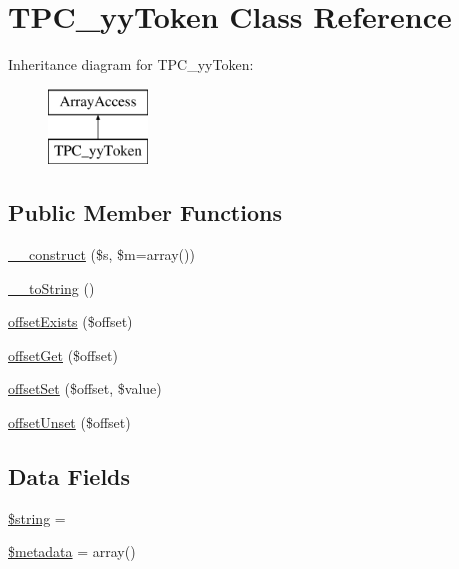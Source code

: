 \hypertarget{class_t_p_c__yy_token}{}\section{T\+P\+C\+\_\+yy\+Token Class Reference}
\label{class_t_p_c__yy_token}
Inheritance diagram for T\+P\+C\+\_\+yy\+Token\+:\begin{figure}[H]
\begin{center}
\leavevmode
\includegraphics[height=2.000000cm]{class_t_p_c__yy_token}
\end{center}
\end{figure}
\subsection*{Public Member Functions}
\begin{DoxyCompactItemize}
\item 
\hyperlink{class_t_p_c__yy_token_ad19e3b36f3e7325b04134c2c8907b139}{\+\_\+\+\_\+construct} (\$s, \$m=array())
\item 
\hyperlink{class_t_p_c__yy_token_a7516ca30af0db3cdbf9a7739b48ce91d}{\+\_\+\+\_\+to\+String} ()
\item 
\hyperlink{class_t_p_c__yy_token_a24ff257ec0c2221bc6fd7b1b4388e26e}{offset\+Exists} (\$offset)
\item 
\hyperlink{class_t_p_c__yy_token_a59aee6e89465b48f014699f41b521f87}{offset\+Get} (\$offset)
\item 
\hyperlink{class_t_p_c__yy_token_ac6bde6b1eb50eb5377e91771fe46b7a3}{offset\+Set} (\$offset, \$value)
\item 
\hyperlink{class_t_p_c__yy_token_a2411227ea7118b13495de9839fd4b563}{offset\+Unset} (\$offset)
\end{DoxyCompactItemize}
\subsection*{Data Fields}
\begin{DoxyCompactItemize}
\item 
\hyperlink{class_t_p_c__yy_token_a05bc82187ba145848edd864852f4bd37}{\$string} = \textquotesingle{}\textquotesingle{}
\item 
\hyperlink{class_t_p_c__yy_token_ae7fc3682b173ad9d4b1892bdc04d18d9}{\$metadata} = array()
\end{DoxyCompactItemize}


